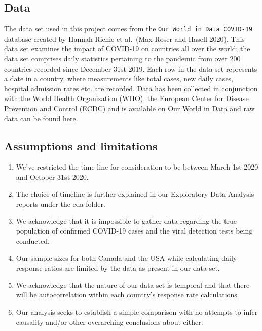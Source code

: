 \documentclass[
]{article}
\providecommand{\tightlist}{%
  \setlength{\itemsep}{0pt}\setlength{\parskip}{0pt}}
\begin{document}
\hypertarget{data}{%
\subsection{Data}\label{data}}

The data set used in this project comes from the
\texttt{Our\ World\ in\ Data\ COVID-19} database created by Hannah
Richie et al.~(Max Roser and Hasell 2020). This data set examines the
impact of COVID-19 on countries all over the world; the data set
comprises daily statistics pertaining to the pandemic from over 200
countries recorded since December 31st 2019. Each row in the data set
represents a date in a country, where measurements like total cases, new
daily cases, hospital admission rates etc. are recorded. Data has been
collected in conjunction with the World Health Organization (WHO), the
European Center for Disease Prevention and Control (ECDC) and is
available on \href{https://ourworldindata.org/coronavirus}{Our World in
Data} and raw data can be found
\href{https://raw.githubusercontent.com/owid/covid-19-data/master/public/data/owid-covid-data.csv}{here}.

\hypertarget{assumptions-and-limitations}{%
\subsection{Assumptions and
limitations}\label{assumptions-and-limitations}}

\begin{enumerate}
\def\labelenumi{\arabic{enumi}.}
\tightlist
\item
  We've restricted the time-line for consideration to be between March
  1st 2020 and October 31st 2020.
\item
  The choice of timeline is further explained in our Exploratory Data
  Analysis reports under the eda folder.
\item
  We acknowledge that it is impossible to gather data regarding the true
  population of confirmed COVID-19 cases and the viral detection tests
  being conducted.
\item
  Our sample sizes for both Canada and the USA while calculating daily
  response ratios are limited by the data as present in our data set.
\item
  We acknowledge that the nature of our data set is temporal and that
  there will be autocorrelation within each country's response rate
  calculations.
\item
  Our analysis seeks to establish a simple comparison with no attempts
  to infer causality and/or other overarching conclusions about either.
\end{enumerate}
\end{document}
